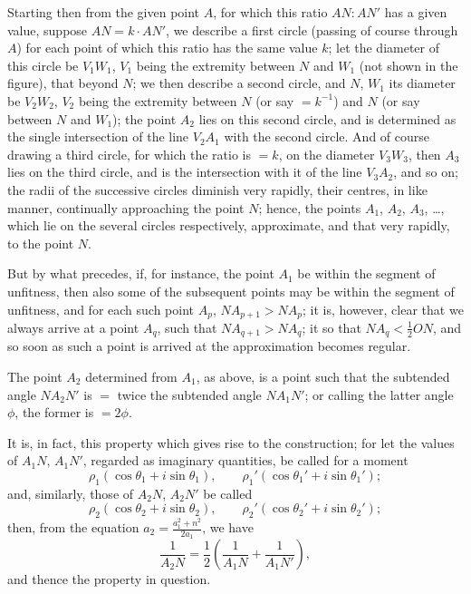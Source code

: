 \documentclass[12pt,a4paper]{article}
\theoremstyle{plain}
\begin{document}
Starting then from the given point $A$, for which this ratio
$AN:A N'$ has a given value, suppose $AN=k\cdot AN'$, we describe a first
circle (passing of course through $A$) for each point of which this ratio
has the same value $k$; let the diameter of this circle be $V_1W_1$, $V_1$
being the extremity between $N$ and $W_1$ (not shown in the figure), that
beyond $N$; we then describe a second circle, and $N$, $W_1$ its diameter
be $V_2W_2$, $V_2$ being the extremity between $N$ (or say $=k^{-1}$) and $N$
(or say between $N$ and $W_1$); the point $A_2$ lies on this second circle,
and is determined as the single intersection of the line $V_2A_1$ with the
second circle. And of course drawing a third circle, for which the ratio
is $=k$, on the diameter $V_3W_3$, then $A_3$ lies on the third circle, and is
the intersection with it of the line $V_3A_2$, and so on; the radii of the
successive circles diminish very rapidly, their centres, in like manner,
continually approaching the point $N$; hence, the points $A_1$, $A_2$,
$A_3$, \dots, which lie on the several circles respectively, approximate, and
that very rapidly, to the point $N$.

But by what precedes, if, for instance, the point $A_1$ be within the
segment of unfitness, then also some of the subsequent points may be
within the segment of unfitness, and for each such point $A_p$,
$NA_{p+1}>NA_p$; it is, however, clear that we always arrive at a point
$A_q$, such that $NA_{q+1}>NA_q$; it so that $NA_q<\frac{1}{2}ON$, and so soon
as such a point is arrived at the approximation becomes regular.

The point $A_2$ determined from $A_1$, as above, is a point such that
the subtended angle $NA_2N'$ is $=$ twice the subtended angle $NA_1N'$;
or calling the latter angle $\phi$, the former is $=2\phi$.

It is, in fact, this property which gives rise to the construction; for let
the values of $A_1N$, $A_1N'$, regarded as imaginary quantities, be called for
a moment
\[
\rho_1(\cos\theta_1+i\sin\theta_1),\qquad
\rho_1'(\cos\theta_1'+i\sin\theta_1');
\]
and, similarly, those of $A_2N$, $A_2N'$ be called
\[
\rho_2(\cos\theta_2+i\sin\theta_2),\qquad
\rho_2'(\cos\theta_2'+i\sin\theta_2');
\]
then, from the equation $a_2=\frac{a_1^2+n^2}{2a_1}$, we have
\[
\frac{1}{A_2N} = \frac{1}{2}\left(\frac{1}{A_1N}+\frac{1}{A_1N'}\right),
\]
and thence the property in question.

\newpage
\end{document}
